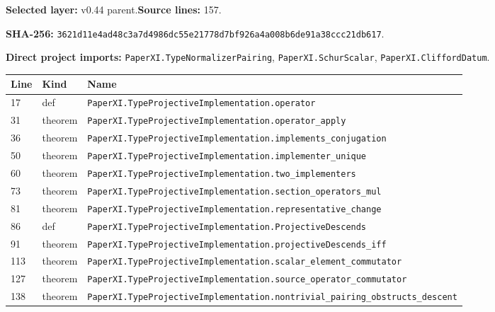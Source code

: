 \documentclass[10pt,oneside]{book}
\begin{document}
\textbf{Selected layer:} v0.44 parent.\quad\textbf{Source lines:} 157.\par\textbf{SHA-256:} {\scriptsize\nolinkurl{3621d11e4ad48c3a7d4986dc55e21778d7bf926a4a008b6de91a38ccc21db617}}.


\textbf{Direct project imports:} \nolinkurl{PaperXI.TypeNormalizerPairing}, \nolinkurl{PaperXI.SchurScalar}, \nolinkurl{PaperXI.CliffordDatum}.

\begin{longtable}{@{}p{}p{}p{}@{}}\toprule Line&Kind&Name\\\midrule\endhead

17&def&\nolinkurl{PaperXI.TypeProjectiveImplementation.operator}\\

31&theorem&\nolinkurl{PaperXI.TypeProjectiveImplementation.operator_apply}\\

36&theorem&\nolinkurl{PaperXI.TypeProjectiveImplementation.implements_conjugation}\\

50&theorem&\nolinkurl{PaperXI.TypeProjectiveImplementation.implementer_unique}\\

60&theorem&\nolinkurl{PaperXI.TypeProjectiveImplementation.two_implementers}\\

73&theorem&\nolinkurl{PaperXI.TypeProjectiveImplementation.section_operators_mul}\\

81&theorem&\nolinkurl{PaperXI.TypeProjectiveImplementation.representative_change}\\

86&def&\nolinkurl{PaperXI.TypeProjectiveImplementation.ProjectiveDescends}\\

91&theorem&\nolinkurl{PaperXI.TypeProjectiveImplementation.projectiveDescends_iff}\\

113&theorem&\nolinkurl{PaperXI.TypeProjectiveImplementation.scalar_element_commutator}\\

127&theorem&\nolinkurl{PaperXI.TypeProjectiveImplementation.source_operator_commutator}\\

138&theorem&\nolinkurl{PaperXI.TypeProjectiveImplementation.nontrivial_pairing_obstructs_descent}\\

\bottomrule\end{longtable}
\end{document}
